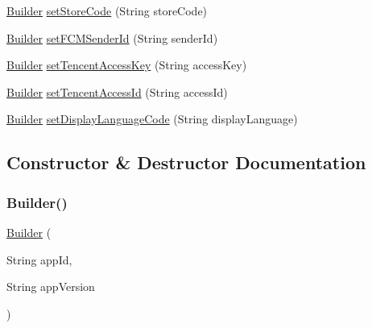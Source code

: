 \begin{DoxyCompactItemize}
\item 
\hyperlink{classcom_1_1toast_1_1android_1_1gamebase_1_1_gamebase_configuration_1_1_builder}{Builder} \hyperlink{classcom_1_1toast_1_1android_1_1gamebase_1_1_gamebase_configuration_1_1_builder_a10964576edd072e214ed8edcd1e7baf8}{set\+Store\+Code} (String store\+Code)
\item 
\hyperlink{classcom_1_1toast_1_1android_1_1gamebase_1_1_gamebase_configuration_1_1_builder}{Builder} \hyperlink{classcom_1_1toast_1_1android_1_1gamebase_1_1_gamebase_configuration_1_1_builder_aa042e4ff4f1dd7038b615dec2d8e4e69}{set\+F\+C\+M\+Sender\+Id} (String sender\+Id)
\item 
\hyperlink{classcom_1_1toast_1_1android_1_1gamebase_1_1_gamebase_configuration_1_1_builder}{Builder} \hyperlink{classcom_1_1toast_1_1android_1_1gamebase_1_1_gamebase_configuration_1_1_builder_ac172551b643355d3ff300fca51c4bd50}{set\+Tencent\+Access\+Key} (String access\+Key)
\item 
\hyperlink{classcom_1_1toast_1_1android_1_1gamebase_1_1_gamebase_configuration_1_1_builder}{Builder} \hyperlink{classcom_1_1toast_1_1android_1_1gamebase_1_1_gamebase_configuration_1_1_builder_a2b5790c8f47b6ed51ff69b9830ca5a2d}{set\+Tencent\+Access\+Id} (String access\+Id)
\item 
\hyperlink{classcom_1_1toast_1_1android_1_1gamebase_1_1_gamebase_configuration_1_1_builder}{Builder} \hyperlink{classcom_1_1toast_1_1android_1_1gamebase_1_1_gamebase_configuration_1_1_builder_a03014f0267bce586f24ebe8478982ed3}{set\+Display\+Language\+Code} (String display\+Language)
\end{DoxyCompactItemize}


\subsection{Constructor \& Destructor Documentation}
\mbox{\label{classcom_1_1toast_1_1android_1_1gamebase_1_1_gamebase_configuration_1_1_builder_afbe6729f6423577d9a06c1832315f37d}} 
\subsubsection{\texorpdfstring{Builder()}{Builder()}\hspace{0.1cm}{\footnotesize\ttfamily [1/2]}}
{\footnotesize\ttfamily \hyperlink{classcom_1_1toast_1_1android_1_1gamebase_1_1_gamebase_configuration_1_1_builder}{Builder} (\begin{DoxyParamCaption}\item[{String}]{app\+Id,  }\item[{String}]{app\+Version }\end{DoxyParamCaption})}

